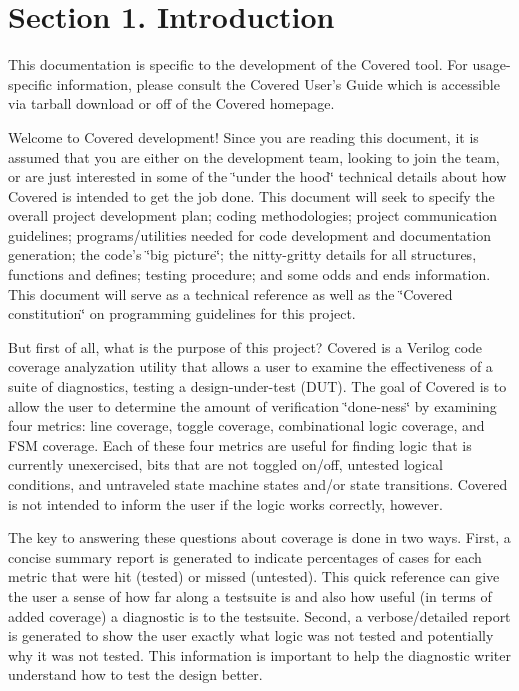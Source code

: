 \section{Section 1.  Introduction}\label{page_intro}
\begin{Desc}
\item[]This documentation is specific to the development of the Covered tool. For usage-specific information, please consult the Covered User's Guide which is accessible via tarball download or off of the Covered homepage.\end{Desc}
\begin{Desc}
\item[]Welcome to Covered development! Since you are reading this document, it is assumed that you are either on the development team, looking to join the team, or are just interested in some of the \char`\"{}under the hood\char`\"{} technical details about how Covered is intended to get the job done. This document will seek to specify the overall project development plan; coding methodologies; project communication guidelines; programs/utilities needed for code development and documentation generation; the code's \char`\"{}big picture\char`\"{}; the nitty-gritty details for all structures, functions and defines; testing procedure; and some odds and ends information. This document will serve as a technical reference as well as the \char`\"{}Covered constitution\char`\"{} on programming guidelines for this project.\end{Desc}
\begin{Desc}
\item[]But first of all, what is the purpose of this project? Covered is a Verilog code coverage analyzation utility that allows a user to examine the effectiveness of a suite of diagnostics, testing a design-under-test (DUT). The goal of Covered is to allow the user to determine the amount of verification \char`\"{}done-ness\char`\"{} by examining four metrics: line coverage, toggle coverage, combinational logic coverage, and FSM coverage. Each of these four metrics are useful for finding logic that is currently unexercised, bits that are not toggled on/off, untested logical conditions, and untraveled state machine states and/or state transitions. Covered is not intended to inform the user if the logic works correctly, however.\end{Desc}
\begin{Desc}
\item[]The key to answering these questions about coverage is done in two ways. First, a concise summary report is generated to indicate percentages of cases for each metric that were hit (tested) or missed (untested). This quick reference can give the user a sense of how far along a testsuite is and also how useful (in terms of added coverage) a diagnostic is to the testsuite. Second, a verbose/detailed report is generated to show the user exactly what logic was not tested and potentially why it was not tested. This information is important to help the diagnostic writer understand how to test the design better.\end{Desc}
